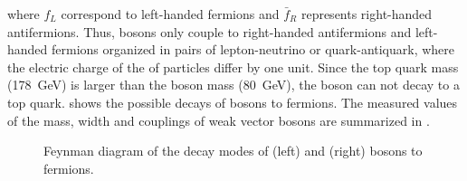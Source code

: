 where $f_{L}$ correspond to left-handed fermions and $\bar{f}_{R}$ represents right-handed antifermions. Thus, {\PW} bosons only couple to right-handed antifermions and left-handed fermions organized in pairs of lepton-neutrino or quark-antiquark, where the electric charge of the of particles differ by one unit. Since the top quark mass (\SI{178}{\GeV}) is larger than the {\PW} boson mass (\SI{80}{\GeV}), the {\PW} boson can not decay to a top quark.  shows the possible decays of {\PW} bosons to fermions. The measured values of the mass, width and couplings of weak vector bosons are summarized in .

\begin{figure}[htbp]
  \vspace{10mm}
  \begin{center}
    \hspace*{2cm}
  \end{center}
  \caption{Feynman diagram of the decay modes of \Wp (left) and \Wm (right) bosons to fermions.}
  \label{dia:WDecays}
\end{figure}

